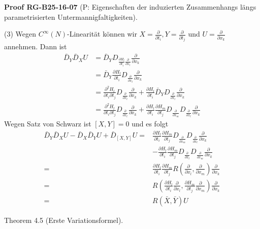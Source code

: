 \documentclass[10pt, letterpaper]{article}
\newcommand{\CustomHeading}[3]{%
  \par\medskip\noindent%
  \textbf{#1 #2} \textnormal{(#3)}.\enskip%
}
\newenvironment{PROOF}[2]{\begin{unitbox}\CustomHeading{Proof}{#1}{#2}}{\end{unitbox}}
\begin{document}
\begin{PROOF}{RG-B25-16-07}{P: Eigenschaften der induzierten Zusammenhangs längs parametrisierten Untermannigfaltigkeiten}
(3) Wegen $C^{\infty}(N)$-Linearität können wir $X=\frac{\partial}{\partial t_{i}}, Y=\frac{\partial}{\partial t_{j}}$ und $U=\frac{\partial}{\partial x_{k}}$ annehmen. Dann ist
$$
\begin{aligned}
\bar{D}_{Y} \bar{D}_{X} U & =\bar{D}_{Y} D_{\frac{\partial H_{l}}{\partial t_{i}} \frac{\partial}{\partial x_{l}}} \frac{\partial}{\partial x_{k}} \\
& =\bar{D}_{Y} \frac{\partial H_{l}}{\partial t_{i}} D_{\frac{\partial}{\partial x_{l}}} \frac{\partial}{\partial x_{k}} \\
& =\frac{\partial^{2} H_{l}}{\partial t_{i} \partial t_{j}} D_{\frac{\partial}{\partial x_{l}}} \frac{\partial}{\partial x_{k}}+\frac{\partial H_{l}}{\partial t_{i}} \bar{D}_{Y} D_{\frac{\partial}{\partial x_{l}}} \frac{\partial}{\partial x_{k}} \\
& =\frac{\partial^{2} H_{l}}{\partial t_{i} \partial t_{j}} D_{\frac{\partial}{\partial x_{l}}} \frac{\partial}{\partial x_{k}}+\frac{\partial H_{l}}{\partial t_{i}} \frac{\partial H_{m}}{\partial t_{j}} D_{\frac{\partial}{\partial x_{m}}} D_{\frac{\partial}{\partial x_{l}}} \frac{\partial}{\partial x_{k}}
\end{aligned}
$$
Wegen Satz von Schwarz ist $[X, Y]=0$ und es folgt
$$
\begin{aligned}
\bar{D}_{Y} \bar{D}_{X} U-\bar{D}_{X} \bar{D}_{Y} U+\bar{D}_{[X, Y]} U= & \frac{\partial H_{l}}{\partial t_{i}} \frac{\partial H_{m}}{\partial t_{j}} D_{\frac{\partial}{\partial x_{m}}} D_{\frac{\partial}{\partial x_{l}}} \frac{\partial}{\partial x_{k}} \\
& -\frac{\partial H_{l}}{\partial t_{i}} \frac{\partial H_{m}}{\partial t_{j}} D_{\frac{\partial}{\partial x_{l}}} D_{\frac{\partial}{\partial x_{m}}} \frac{\partial}{\partial x_{k}} \\
= & \frac{\partial H_{l}}{\partial t_{i}} \frac{\partial H_{m}}{\partial t_{j}} R\left(\frac{\partial}{\partial x_{l}}, \frac{\partial}{\partial x_{m}}\right) \frac{\partial}{\partial x_{k}} \\
= & R\left(\frac{\partial H_{l}}{\partial t_{i}} \frac{\partial}{\partial x_{l}}, \frac{\partial H_{m}}{\partial t_{j}} \frac{\partial}{\partial x_{m}}\right) \frac{\partial}{\partial x_{k}} \\
= & R(\bar{X}, \bar{Y}) U
\end{aligned}
$$
\end{PROOF}




Theorem 4.5 (Erste Variationsformel). 
\end{document}
